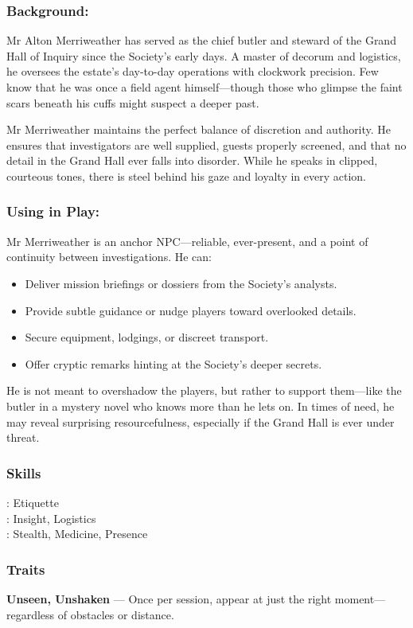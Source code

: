     \begin{paracol}{3}
        \subsubsection*{Background:}
        Mr Alton Merriweather has served as the chief butler and steward of the Grand Hall of Inquiry since the Society's early days. A master of decorum and logistics, he oversees the estate’s day-to-day operations with clockwork precision. Few know that he was once a field agent himself—though those who glimpse the faint scars beneath his cuffs might suspect a deeper past.
      
        Mr Merriweather maintains the perfect balance of discretion and authority. He ensures that investigators are well supplied, guests properly screened, and that no detail in the Grand Hall ever falls into disorder. While he speaks in clipped, courteous tones, there is steel behind his gaze and loyalty in every action.
      
        \switchcolumn
        \subsubsection*{Using in Play:}
        Mr Merriweather is an anchor NPC—reliable, ever-present, and a point of continuity between investigations. He can:
        \begin{itemize}
          \item Deliver mission briefings or dossiers from the Society’s analysts.
          \item Provide subtle guidance or nudge players toward overlooked details.
          \item Secure equipment, lodgings, or discreet transport.
          \item Offer cryptic remarks hinting at the Society’s deeper secrets.
        \end{itemize}
        He is not meant to overshadow the players, but rather to support them—like the butler in a mystery novel who knows more than he lets on. In times of need, he may reveal surprising resourcefulness, especially if the Grand Hall is ever under threat.
      
        \switchcolumn      
        \subsubsection{Skills}
            \noindent\Expert: Etiquette \\
            \noindent\Skilled: Insight, Logistics \\
            \noindent\Novice: Stealth, Medicine, Presence \\
        \subsubsection{Traits}
          \textbf{Unseen, Unshaken} — Once per session, appear at just the right moment—regardless of obstacles or distance.
      
    \end{paracol}
